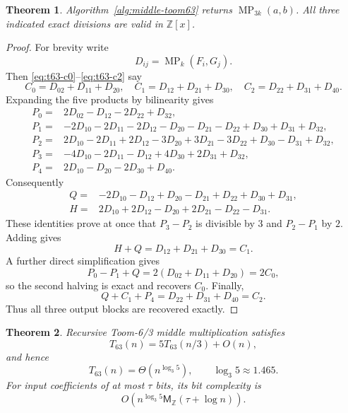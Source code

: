 \documentclass[11pt]{book}
\newtheorem{theorem}{Theorem}[section]
\theoremstyle{definition}
\newcommand{\ZZ}{\mathbb Z}
\newcommand{\MZ}{\mathsf M_{\ZZ}}
\begin{document}
\begin{theorem}\label{thm:middle-toom63-correct}
Algorithm~\ref{alg:middle-toom63} returns
$\operatorname{MP}_{3k}(a,b)$.  All three indicated exact divisions are valid
in $\ZZ[x]$.
\end{theorem}

\begin{proof}
For brevity write
\[
 D_{ij}=\operatorname{MP}_k(F_i,G_j).
\]
Then \eqref{eq:t63-c0}--\eqref{eq:t63-c2} say
\[
 C_0=D_{02}+D_{11}+D_{20},\quad
 C_1=D_{12}+D_{21}+D_{30},\quad
 C_2=D_{22}+D_{31}+D_{40}.
\]
Expanding the five products by bilinearity gives
\begin{align*}
 P_0={}&2D_{02}-D_{12}-2D_{22}+D_{32},\\
 P_1={}&-2D_{10}-2D_{11}-2D_{12}-D_{20}-D_{21}-D_{22}
          +D_{30}+D_{31}+D_{32},\\
 P_2={}&2D_{10}-2D_{11}+2D_{12}-3D_{20}+3D_{21}-3D_{22}
          +D_{30}-D_{31}+D_{32},\\
 P_3={}&-4D_{10}-2D_{11}-D_{12}+4D_{30}+2D_{31}+D_{32},\\
 P_4={}&2D_{10}-D_{20}-2D_{30}+D_{40}.
\end{align*}
Consequently
\begin{align*}
 Q={}&-2D_{10}-D_{12}+D_{20}-D_{21}+D_{22}+D_{30}+D_{31},\\
 H={}&2D_{10}+2D_{12}-D_{20}+2D_{21}-D_{22}-D_{31}.
\end{align*}
These identities prove at once that $P_3-P_2$ is divisible by $3$ and
$P_2-P_1$ by $2$.  Adding gives
\[
 H+Q=D_{12}+D_{21}+D_{30}=C_1.
\]
A further direct simplification gives
\[
 P_0-P_1+Q=2(D_{02}+D_{11}+D_{20})=2C_0,
\]
so the second halving is exact and recovers $C_0$.  Finally,
\[
 Q+C_1+P_4=D_{22}+D_{31}+D_{40}=C_2.
\]
Thus all three output blocks are recovered exactly.
\end{proof}

\begin{theorem}\label{thm:middle-toom63-complexity}
Recursive Toom-6/3 middle multiplication satisfies
\[
 T_{63}(n)=5T_{63}(n/3)+O(n),
\]
and hence
\[
 T_{63}(n)=\Theta\!\left(n^{\log_3 5}\right),
 \qquad \log_3 5\approx1.465.
\]
For input coefficients of at most $\tau$ bits, its bit complexity is
\[
 O\!\left(n^{\log_3 5}\MZ(\tau+\log n)\right).
\]
\end{theorem}
\end{document}
